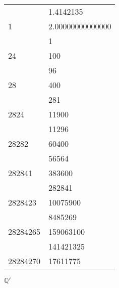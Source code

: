 \documentclass[a4paper]{article}
\begin{document}
\begin{center}
\begin{tabular}{l|l } 
 
       & 1.4142135 \\\cline{2-2}
1      & 2.00000000000000 \\
       & 1 \\\cline{2-2} 
24     & 100\\ 
       &{\hspace{2mm}96}\\\cline{2-2} 
28     &{\hspace{4mm}400}\\
       &{\hspace{4mm}281}\\\cline{2-2}
2824   &{\hspace{4mm}11900}\\
       &{\hspace{4mm}11296}\\\cline{2-2} 
28282  &{\hspace{8mm}60400}\\ 
       &{\hspace{8mm}56564}\\\cline{2-2} 
282841 &{\hspace{10mm}383600}\\ 
       &{\hspace{10mm}282841}\\\cline{2-2}
2828423&{\hspace{10mm}10075900}\\ 
       &{\hspace{10mm}8485269}\\\cline{2-2}
28284265&{\hspace{10mm}159063100}\\
       &{\hspace{10mm}141421325}\\\cline{2-2} 
28284270&{\hspace{12mm}17611775}                              
\end{tabular}
\end{center}

$\mathbb{Q'}$
\end{document}
